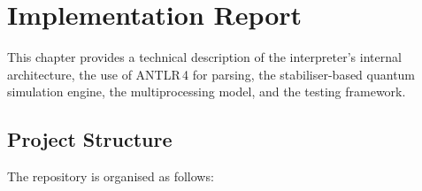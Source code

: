 \section{Implementation Report}
\label{sec:implementation-report}

This chapter provides a technical description of the interpreter's internal
architecture, the use of ANTLR\,4 for parsing, the stabiliser-based quantum
simulation engine, the multiprocessing model, and the testing framework.

\subsection{Project Structure}
\label{sec:impl-project-structure}

The repository is organised as follows:

